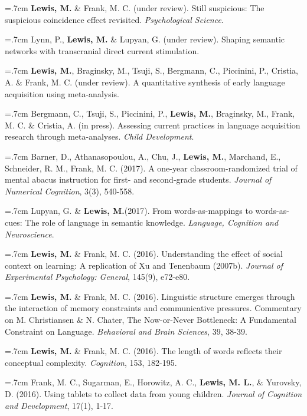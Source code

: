 \documentclass[letterpaper]{article}
\begin{document}
\onehalfspacing

\hangindent=.7cm {\bf Lewis, M.} \& Frank, M. C. (under review). Still suspicious: The suspicious coincidence effect revisited. {\it Psychological Science}.

\hangindent=.7cm Lynn, P., {\bf Lewis, M.} \& Lupyan, G. (under review). Shaping semantic networks with transcranial direct current stimulation.

\hangindent=.7cm {\bf Lewis, M.}, Braginsky, M., Tsuji, S., Bergmann, C., Piccinini, P., Cristia, A. \& Frank, M. C. (under review). A quantitative synthesis of early language acquisition using meta-analysis. 
  

\hangindent=.7cm Bergmann, C., Tsuji, S., Piccinini, P., {\bf Lewis, M.}, Braginsky, M., Frank, M. C. \& Cristia, A. (in press). Assessing current practices in language acquisition research through meta-analyses. {\it Child Development}.


\hangindent=.7cm Barner, D., Athanasopoulou, A., Chu, J., {\bf Lewis, M.}, Marchand, E., Schneider, R. M., Frank, M. C. (2017). A one-year classroom-randomized trial of mental abacus instruction for first- and second-grade students.  {\it Journal of Numerical Cognition}, 3(3), 540-558.

\hangindent=.7cm Lupyan, G. \& {\bf Lewis, M.}(2017). From words-as-mappings to words-as-cues: The role of language in semantic knowledge. {\it Language, Cognition and Neuroscience}.

  \hangindent=.7cm {\bf Lewis, M.} \& Frank, M. C. (2016). Understanding the effect of social context on learning: A replication of Xu and Tenenbaum (2007b). {\it Journal of Experimental Psychology: General}, 145(9), e72-e80.

 \hangindent=.7cm {\bf Lewis, M.} \& Frank, M. C. (2016). Linguistic structure emerges through the interaction of memory constraints and communicative pressures. Commentary on M. Christiansen \& N. Chater, The Now-or-Never Bottleneck: A Fundamental Constraint on Language. {\it Behavioral and Brain Sciences}, 39, 38-39.
 
  \hangindent=.7cm {\bf Lewis, M.} \& Frank, M. C. (2016). The length of words reflects their conceptual complexity. {\it Cognition}, 153, 182-195.

 \hangindent=.7cm Frank, M. C., Sugarman, E., Horowitz, A. C., {\bf Lewis, M. L.}, \& Yurovsky, D. (2016). Using tablets to collect data from young children. {\it Journal of Cognition and Development}, 17(1), 1-17. 
 
\end{document}
